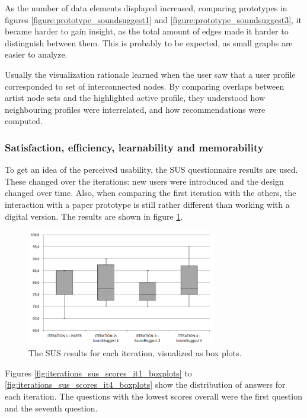 \documentclass[a4paper,10pt,twocolumn]{article}
\begin{document}
As the number of data elements displayed increased, comparing prototypes in figures \ref{figure:prototype_soundsuggest1} and \ref{figure:prototype_soundsuggest3}, it became harder to gain insight, as the total amount of edges made it harder to distinguish between them. This is probably to be expected, as small graphs are easier to analyze\cite{herman:2000}.

Usually the visualization rationale learned when the user saw that a user profile corresponded to set of interconnected nodes. By comparing overlaps between artist node sets and the highlighted active profile, they understood how neighbouring profiles were interrelated, and how recommendations were computed.


\subsubsection{Satisfaction, efficiency, learnability and memorability}

To get an idea of the perceived usability, the SUS questionnaire results are used. These changed over the iterations: new users were introduced and the design changed over time. Also, when comparing the first iteration with the others, the interaction with a paper prototype is still rather different than working with a digital version. The results are shown in figure \ref{fig:iterations_sus_scores_boxplots}.

\begin{figure}
	\includegraphics[width=8.3cm]{img/iterations_sus_scores_boxplots}
	\caption{The SUS results for each iteration, visualized as box plots.}
	\label{fig:iterations_sus_scores_boxplots}
\end{figure}


Figures \ref{fig:iterations_sus_scores_it1_boxplots} to \ref{fig:iterations_sus_scores_it4_boxplots} show the distribution of answers for each iteration. The questions with the lowest scores overall were the first question and the seventh question.
\end{document}
